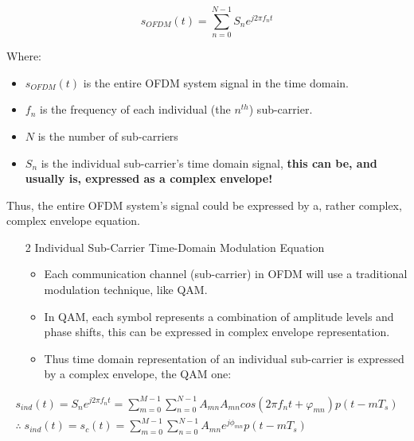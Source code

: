 \documentclass[colorlinks,11pt,a4paper,normalphoto,withhyper,ragged2e]{altareport}
\begin{document}
				\begin{equation}
					s_{OFDM}(t) = \sum_{n=0}^{N-1} S_n e^{j2\pi f_n t} 
				\end{equation}
				
				Where:
				\begin{itemize}
					\item $s_{OFDM}(t)$ is the entire OFDM system signal in the time domain.
					\item $f_n$ is the frequency of each individual (the $n^{th}$) sub-carrier.
					\item $N$ is the number of sub-carriers
					\item $S_n$ is the individual sub-carrier's time domain signal, \textbf{this can be, and usually is, expressed as a complex envelope!}
				\end{itemize}
				\vspace{0.25cm}
				
				Thus, the entire OFDM system's signal could be expressed by a, rather complex, complex envelope equation. \linebreak
				
				\pagebreak
				
				\begin{enumerate}
					\item[2] Individual Sub-Carrier Time-Domain Modulation Equation
					\begin{itemize}[leftmargin=1cm]
						\item Each communication channel (sub-carrier) in OFDM will use a traditional modulation technique, like QAM.
						\item In QAM, each symbol represents a combination of amplitude levels and phase shifts, this can be expressed in complex envelope representation.
						\item Thus time domain representation of an individual sub-carrier is expressed by a complex envelope, the QAM one: 
					\end{itemize}
				\end{enumerate}
				
				\begin{gather*}
					s_{ind}(t) = S_n e^{j 2 \pi f_n t} = \sum_{m=0}^{M-1} \sum_{n=0}^{N-1} A_{mn} A_{mn} cos(2 \pi f_n t + \varphi_{mn}) p(t-mT_s) \\
					\therefore \; s_{ind}(t) = s_c(t) = \sum_{m=0}^{M-1} \sum_{n=0}^{N-1} A_{mn} e^{j\phi_{mn}} p(t - mT_s)
				\end{gather*}
				
\end{document}
